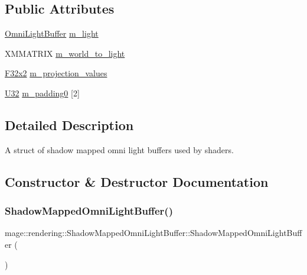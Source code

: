 \subsection*{Public Attributes}
\begin{DoxyCompactItemize}
\item 
\mbox{\hyperlink{structmage_1_1rendering_1_1_omni_light_buffer}{Omni\+Light\+Buffer}} \mbox{\hyperlink{structmage_1_1rendering_1_1_shadow_mapped_omni_light_buffer_a6b316ed6c8b69d5aeb15fbe93c23de95}{m\+\_\+light}}
\item 
X\+M\+M\+A\+T\+R\+IX \mbox{\hyperlink{structmage_1_1rendering_1_1_shadow_mapped_omni_light_buffer_a6ad3f982000ca1d68c3897589aa89798}{m\+\_\+world\+\_\+to\+\_\+light}}
\item 
\mbox{\hyperlink{namespacemage_a9dc0d34d6ecc87e4cfa4a826102117bc}{F32x2}} \mbox{\hyperlink{structmage_1_1rendering_1_1_shadow_mapped_omni_light_buffer_a29016735134bb44c6c6f0d52fbf9ef2c}{m\+\_\+projection\+\_\+values}}
\item 
\mbox{\hyperlink{namespacemage_a41c104c036fba3756a74e19f793eeaa1}{U32}} \mbox{\hyperlink{structmage_1_1rendering_1_1_shadow_mapped_omni_light_buffer_a01a76a39534ba04a2b1fe77ae5d1522c}{m\+\_\+padding0}} \mbox{[}2\mbox{]}
\end{DoxyCompactItemize}


\subsection{Detailed Description}
A struct of shadow mapped omni light buffers used by shaders. 

\subsection{Constructor \& Destructor Documentation}
\mbox{\label{structmage_1_1rendering_1_1_shadow_mapped_omni_light_buffer_a3b9f6ffd582185ea739410aeeec8a446}} 
\subsubsection{\texorpdfstring{Shadow\+Mapped\+Omni\+Light\+Buffer()}{ShadowMappedOmniLightBuffer()}\hspace{0.1cm}{\footnotesize\ttfamily [1/3]}}
{\footnotesize\ttfamily mage\+::rendering\+::\+Shadow\+Mapped\+Omni\+Light\+Buffer\+::\+Shadow\+Mapped\+Omni\+Light\+Buffer (\begin{DoxyParamCaption}{ }\end{DoxyParamCaption})\hspace{0.3cm}{\ttfamily [noexcept]}}

